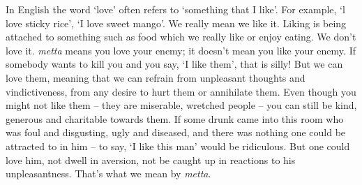 
In English the word `love' often refers to `something that I like'. For example, `l love sticky rice', `I love sweet mango'. We really mean we like it. Liking is being attached to something such as food which we really like or enjoy eating. We don't love it. \textit{metta} means you love your enemy; it doesn't mean you like your enemy. If somebody wants to kill you and you say, `I like them', that is silly! But we can love them, meaning that we can refrain from unpleasant thoughts and vindictiveness, from any desire to hurt them or annihilate them. Even though you might not like them -- they are miserable, wretched people -- you can still be kind, generous and charitable towards them. If some drunk came into this room who was foul and disgusting, ugly and diseased, and there was nothing one could be attracted to in him -- to say, `I like this man' would be ridiculous. But one could love him, not dwell in aversion, not be caught up in reactions to his unpleasantness. That's what we mean by \textit{metta}.

